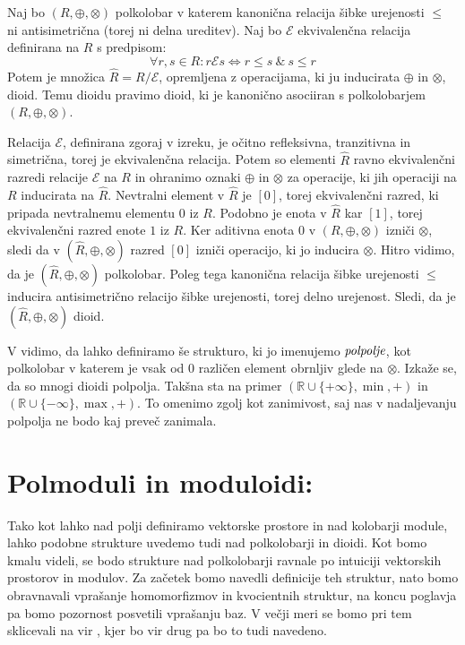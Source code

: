 \documentclass[mat1]{fmfdelo}
\newcommand{\R}{\mathbb{R}}
\newcommand{\pojem}[1]{\ensuremath{\emph{#1}}}
\begin{document}
\begin{trditev}
	Naj bo $(R, \oplus, \otimes)$ polkolobar v katerem kanonična relacija šibke urejenosti  $\leq$ ni antisimetrična (torej ni delna ureditev). Naj bo $\mathcal{E}$ ekvivalenčna relacija definirana na $R$ s predpisom:
$$\forall r, s\in R: r\mathcal{E}s \iff r\leq s ~\&~ s \leq r$$
	Potem je množica $\widehat{R} = R / \mathcal{E}$, opremljena z operacijama, ki ju inducirata $\oplus$ in $\otimes$, dioid. Temu dioidu pravimo dioid, ki je kanonično asociiran s polkolobarjem $(R, \oplus, \otimes)$.
\end{trditev}
\begin{dokaz}
	Relacija $\mathcal{E}$, definirana zgoraj v izreku, je očitno refleksivna, tranzitivna in simetrična, torej je ekvivalenčna relacija. Potem so elementi $\widehat{R}$ ravno ekvivalenčni razredi relacije $\mathcal{E}$ na $R$ in ohranimo oznaki $\oplus$ in $\otimes$ za operacije, ki jih operaciji na $R$ inducirata na $\widehat{R}$. Nevtralni element v $\widehat{R}$ je $[0]$, torej ekvivalenčni razred, ki pripada nevtralnemu elementu $0$ iz $R$. Podobno je enota v $\widehat{R}$ kar $[1]$, torej ekvivalenčni razred enote $1$ iz $R$. Ker aditivna enota $0$ v $(R, \oplus, \otimes)$ izniči $\otimes$, sledi da v $(\widehat{R}, \oplus, \otimes)$ razred $[0]$ izniči operacijo, ki jo inducira $\otimes$. Hitro vidimo, da je $(\widehat{R}, \oplus, \otimes)$ polkolobar. Poleg tega kanonična relacija šibke urejenosti $\leq$ inducira antisimetrično relacijo šibke urejenosti, torej delno urejenost. Sledi, da je $(\widehat{R}, \oplus, \otimes)$ dioid.
\end{dokaz}
\begin{opomba}
	V \cite[poglavje 1, definicija 5.\,2.\,3.\,]{bib:Gondran} vidimo, da lahko definiramo še strukturo, ki jo imenujemo \pojem{polpolje}, kot polkolobar v katerem je vsak od $0$ različen element obrnljiv glede na $\otimes$. Izkaže se, da so mnogi dioidi polpolja. Takšna sta na primer $(\R\cup\{+\infty\}, \min, +)$ in $(\R\cup\{-\infty\}, \max, +)$. To omenimo zgolj kot zanimivost, saj nas v nadaljevanju polpolja ne bodo kaj preveč zanimala.
\end{opomba}

\section{Polmoduli in moduloidi:}\label{sect:semimodule}
Tako kot lahko nad polji definiramo vektorske prostore in nad kolobarji module, lahko podobne strukture uvedemo tudi nad polkolobarji in dioidi. Kot bomo kmalu videli, se bodo strukture nad polkolobarji ravnale po intuiciji vektorskih prostorov in modulov. Za začetek bomo navedli definicije teh struktur, nato bomo obravnavali vprašanje homomorfizmov in kvocientnih struktur, na koncu poglavja pa bomo pozornost posvetili vprašanju baz. V večji meri se bomo pri tem sklicevali na vir \cite[poglavje 5.\,2.\,]{bib:Gondran}, kjer bo vir drug pa bo to tudi navedeno.
\end{document}

